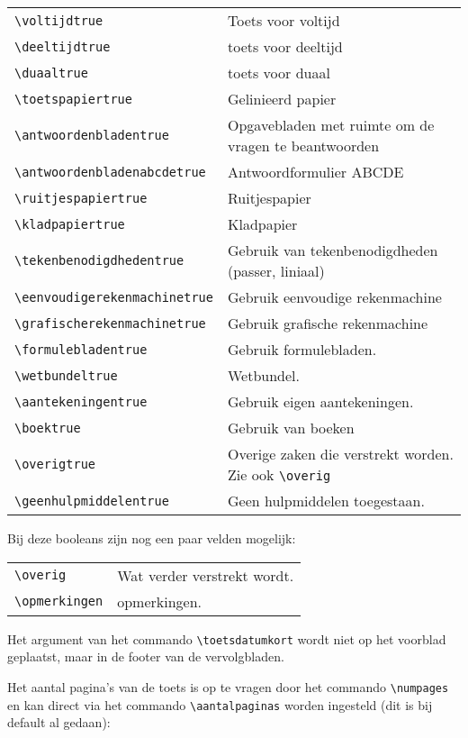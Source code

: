 \documentclass[12pt,dutch,addpoints,fleqn]{tisdexam}
\begin{document}
\bigskip
\begin{tabular}{lp{10cm}}
\verb|\voltijdtrue| & Toets voor voltijd \\
\verb|\deeltijdtrue| & toets voor deeltijd \\
\verb|\duaaltrue| & toets voor duaal \\
\verb|\toetspapiertrue| & Gelinieerd papier \\
\verb|\antwoordenbladentrue| & Opgavebladen met ruimte om de vragen te beantwoorden \\
\verb|\antwoordenbladenabcdetrue| & Antwoordformulier ABCDE \\
\verb|\ruitjespapiertrue| & Ruitjespapier \\
\verb|\kladpapiertrue| & Kladpapier \\
\verb|\tekenbenodigdhedentrue| & Gebruik van tekenbenodigdheden (passer, liniaal) \\
\verb|\eenvoudigerekenmachinetrue| & Gebruik eenvoudige rekenmachine \\ 
\verb|\grafischerekenmachinetrue| & Gebruik grafische rekenmachine \\
\verb|\formulebladentrue| & Gebruik formulebladen. \\
\verb|\wetbundeltrue| & Wetbundel. \\
\verb|\aantekeningentrue| & Gebruik eigen aantekeningen. \\
\verb|\boektrue| & Gebruik van boeken  \\
\verb|\overigtrue| & Overige zaken die verstrekt worden. Zie ook \verb|\overig| \\
\verb|\geenhulpmiddelentrue| & Geen hulpmiddelen toegestaan.
\end{tabular}





\medskip
Bij deze booleans zijn nog een paar velden mogelijk:

\bigskip
\begin{tabular}{lp{15cm}}
\verb|\overig| & Wat verder verstrekt wordt. \\
\verb|\opmerkingen| & opmerkingen.
\end{tabular}


\medskip
Het argument van het commando \verb|\toetsdatumkort| wordt niet op het voorblad
geplaatst, maar in de footer van de vervolgbladen.

\medskip
Het aantal pagina's van de toets is op te vragen door het commando \verb|\numpages| en
kan direct via het commando \verb|\aantalpaginas| worden ingesteld (dit is bij default
al gedaan):
\end{document}
